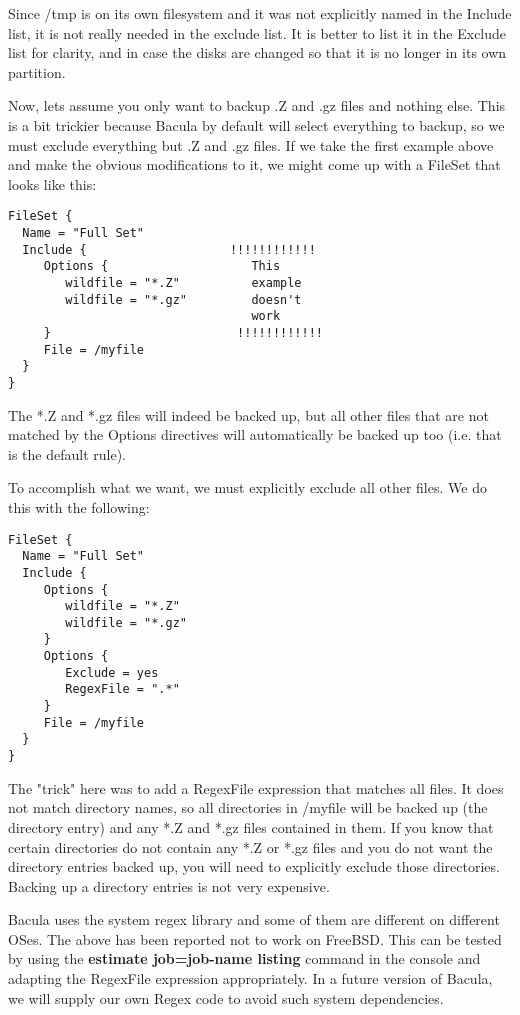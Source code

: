 Since /tmp is on its own filesystem and it was not explicitly named in the
Include list, it is not really needed in the exclude list. It is better to
list it in the Exclude list for clarity, and in case the disks are changed so
that it is no longer in its own partition. 

Now, lets assume you only want to backup .Z and .gz files and nothing 
else. This is a bit trickier because Bacula by default will select 
everything to backup, so we must exclude everything but .Z and .gz files.
If we take the first example above and make the obvious modifications
to it, we might come up with a FileSet that looks like this:

\footnotesize 
\begin{verbatim}
FileSet {
  Name = "Full Set"
  Include {                    !!!!!!!!!!!!
     Options {                    This
        wildfile = "*.Z"          example
        wildfile = "*.gz"         doesn't
                                  work
     }                          !!!!!!!!!!!!
     File = /myfile
  }
}
\end{verbatim}
\normalsize

The *.Z and *.gz files will indeed be backed up, but all other files
that are not matched by the Options directives will automatically
be backed up too (i.e. that is the default rule).

To accomplish what we want, we must explicitly exclude all other files.
We do this with the following:

\footnotesize
\begin{verbatim}
FileSet {
  Name = "Full Set"
  Include {
     Options {
        wildfile = "*.Z"
        wildfile = "*.gz"
     }
     Options {
        Exclude = yes
        RegexFile = ".*"
     }
     File = /myfile
  }
}
\end{verbatim}
\normalsize

The "trick" here was to add a RegexFile expression that matches
all files. It does not match directory names, so all directories in
/myfile will be backed up (the directory entry) and any *.Z and *.gz
files contained in them. If you know that certain directories do
not contain any *.Z or *.gz files and you do not want the directory
entries backed up, you will need to explicitly exclude those directories.
Backing up a directory entries is not very expensive.

Bacula uses the system regex library and some of them are
different on different OSes. The above has been reported not to work
on FreeBSD. This can be tested by using the {\bf estimate job=job-name
listing} command in the console and adapting the RegexFile expression
appropriately. In a future version of Bacula, we will supply our own
Regex code to avoid such system dependencies.

